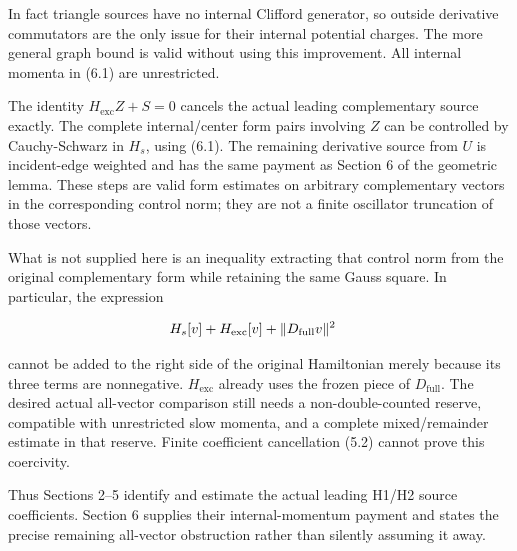 In fact triangle sources have no internal Clifford generator, so outside
derivative commutators are the only issue for their internal potential
charges. The more general graph bound is valid without using this
improvement. All internal momenta in (6.1) are unrestricted.

The identity \(H_{\mathrm{exc}} Z+S=0\) cancels the actual leading
complementary source exactly. The complete internal/center form pairs
involving \(Z\) can be controlled by Cauchy-Schwarz in \(H_{s}\), using
(6.1). The remaining derivative source from \(U\) is incident-edge
weighted and has the same payment as Section \(6\) of the geometric
lemma. These steps are valid form estimates on arbitrary complementary
vectors in the corresponding control norm; they are not a finite
oscillator truncation of those vectors.

What is not supplied here is an inequality extracting that control norm
from the original complementary form while retaining the same Gauss
square. In particular, the expression

\begin{gather*}
\begin{aligned}
& H_{s}[v]+H_{\mathrm{exc}}[v]+\Vert D_{\mathrm{full}} v\Vert ^{2}
\end{aligned}\notag
\end{gather*}

cannot be added to the right side of the original Hamiltonian merely
because its three terms are nonnegative. \(H_{\mathrm{exc}}\) already
uses the frozen piece of \(D_{\mathrm{full}}\). The desired actual
all-vector comparison still needs a non-double-counted reserve,
compatible with unrestricted slow momenta, and a complete
mixed/remainder estimate in that reserve. Finite coefficient
cancellation (5.2) cannot prove this coercivity.

Thus Sections 2--5 identify and estimate the actual leading H1/H2 source
coefficients. Section \(6\) supplies their internal-momentum payment and
states the precise remaining all-vector obstruction rather than silently
assuming it away.
